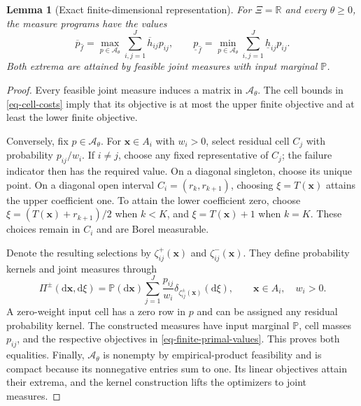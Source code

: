 \documentclass[review,11pt,3p,authoryear,nopreprintline]{elsarticle}
\newtheorem{lemma}{Lemma}
\begin{document}
\begin{lemma}[Exact finite-dimensional representation]
  \label{lem-exact-aggregation}
  For $\Xi=\mathbb R$ and every $\theta\ge0$, the measure programs have the values
  \begin{equation}
    \overline p_{\hat f}=\max_{p\in\mathcal A_\theta}\sum_{i,j=1}^J\overline h_{ij}p_{ij},\qquad
    \underline p_{\hat f}=\min_{p\in\mathcal A_\theta}\sum_{i,j=1}^J\underline h_{ij}p_{ij}.
    \label{eq-finite-primal-values}
  \end{equation}
  Both extrema are attained by feasible joint measures with input marginal $\mathbb P$.
\end{lemma}
\begin{proof}
  Every feasible joint measure induces a matrix in $\mathcal A_\theta$. The cell bounds in \eqref{eq-cell-costs} imply that its objective is at most the upper finite objective and at least the lower finite objective.

  Conversely, fix $p\in\mathcal A_\theta$. For $\bm x\in A_i$ with $w_i>0$, select residual cell $C_j$ with probability $p_{ij}/w_i$. If $i\ne j$, choose any fixed representative of $C_j$; the failure indicator then has the required value. On a diagonal singleton, choose its unique point. On a diagonal open interval $C_i=(r_k,r_{k+1})$, choosing $\xi=T(\bm x)$ attains the upper coefficient one. To attain the lower coefficient zero, choose $\xi=(T(\bm x)+r_{k+1})/2$ when $k<K$, and $\xi=T(\bm x)+1$ when $k=K$. These choices remain in $C_i$ and are Borel measurable.

  Denote the resulting selections by $\zeta_{ij}^{+}(\bm x)$ and $\zeta_{ij}^{-}(\bm x)$. They define probability kernels and joint measures through
  \[
    \Pi^{\pm}\left(\mathrm d\bm x,\mathrm d\xi\right)
    =\mathbb P\left(\mathrm d\bm x\right)
    \sum_{j=1}^J\frac{p_{ij}}{w_i}
    \delta_{\zeta_{ij}^{\pm}(\bm x)}\left(\mathrm d\xi\right),
    \qquad\bm x\in A_i,\quad w_i>0.
  \]
  A zero-weight input cell has a zero row in $p$ and can be assigned any residual probability kernel. The constructed measures have input marginal $\mathbb P$, cell masses $p_{ij}$, and the respective objectives in \eqref{eq-finite-primal-values}. This proves both equalities. Finally, $\mathcal A_\theta$ is nonempty by empirical-product feasibility and is compact because its nonnegative entries sum to one. Its linear objectives attain their extrema, and the kernel construction lifts the optimizers to joint measures.
\end{proof}
\end{document}
